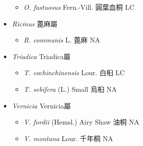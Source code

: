 \begin{itemize}
  \begin{itemize}
        \item[] \textit{O. fastuosus} Fern.-Vill.  圓葉血桐   LC
  \end{itemize}
 \item[] \textit{Ricinus} 蓖麻屬
                                
  \begin{itemize}
        \item[] \textit{R. communis} L.  蓖麻   NA
  \end{itemize}
 \item[] \textit{Triadica} Triadica屬
                                
  \begin{itemize}
        \item[] \textit{T. cochinchinensis} Lour.  白桕   LC
        \item[] \textit{T. sebifera} (L.) Small  烏桕   NA
  \end{itemize}
 \item[] \textit{Vernicia} Vernicia屬
                                
  \begin{itemize}
        \item[] \textit{V. fordii} (Hemsl.) Airy Shaw  油桐   NA
        \item[] \textit{V. montana} Lour.  千年桐   NA
  \end{itemize}
  \end{itemize}
